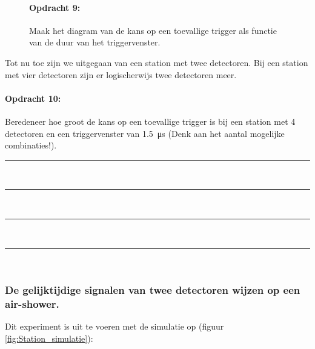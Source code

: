 \bigskip{}


\begin{figure}[ht]
    \paragraph{Opdracht 9:}

    Maak het diagram van de kans op een toevallige trigger als
    functie van de duur van het triggervenster.\bigskip{}

\end{figure}

\bigskip{}

Tot nu toe zijn we uitgegaan van een station met twee detectoren.
Bij een station met vier detectoren zijn er logischerwijs twee detectoren
meer.

\begin{minipage}[t]{1\columnwidth}%

\paragraph{Opdracht 10:}

Beredeneer hoe groot de kans op een toevallige trigger is
bij een station met 4 detectoren en een triggervenster van \SI{1.5}{\micro\second}
(Denk aan het aantal mogelijke combinaties!).

\begin{center}
    \rule{\textwidth}{0.3mm}\\
    \rule{\textwidth}{0.3mm}\\
    \rule{\textwidth}{0.3mm}\\
    \rule{\textwidth}{0.3mm}\\
\end{center}
\end{minipage}

\bigskip{}

\subsubsection{De gelijktijdige signalen van twee detectoren wijzen op
               een air-shower.}

Dit experiment is uit te voeren met de simulatie op (figuur \ref{fig:Station_simulatie}):


